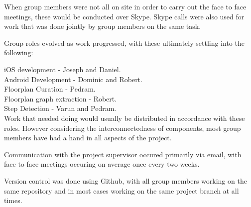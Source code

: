 \documentclass[12pt,a4paper]{report}
\begin{document}
When group members were not all on site in order to carry out the face to face meetings, these would be conducted over Skype. Skype calls were also used for work that was done jointly by group members on the same task.
 
 Group roles evolved as work progressed, with these ultimately settling into the following:
 
 iOS development - Joseph and Daniel.\\
 Android Development - Dominic and Robert. \\
 Floorplan Curation - Pedram. \\
 Floorplan graph extraction - Robert. \\
 Step Detection - Varun and Pedram.\\

Work that needed doing would usually be distributed in accordance with these roles. However considering the interconnectedness of components, most group members have had a hand in all aspects of the project.

Communication with the project supervisor occured primarily via email, with face to face meetings occuring on average once every two weeks.

Version control was done using Github, with all group members working on the same repository and in most cases working on the same project branch at all times.
\end{document}
